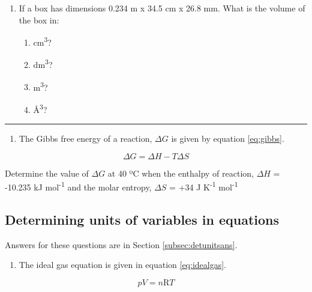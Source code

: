 \documentclass[
]{book}
\providecommand{\tightlist}{%
  \setlength{\itemsep}{0pt}\setlength{\parskip}{0pt}}
\begin{document}
\begin{enumerate}
\def\labelenumi{\arabic{enumi}.}
\setcounter{enumi}{1}
\tightlist
\item
  If a box has dimensions 0.234 m x 34.5 cm x 26.8 mm. What is the volume of the box in:

  \begin{enumerate}
  \def\labelenumii{\alph{enumii}.}
  \tightlist
  \item
    cm\textsuperscript{3}?
  \item
    dm\textsuperscript{3}?
  \item
    m\textsuperscript{3}?
  \item
    Å\textsuperscript{3}?
  \end{enumerate}
\end{enumerate}

\begin{center}\rule{0.5\linewidth}{0.5pt}\end{center}

\begin{enumerate}
\def\labelenumi{\arabic{enumi}.}
\setcounter{enumi}{2}
\tightlist
\item
  The Gibbs free energy of a reaction, \(\Delta G\) is given by equation \eqref{eq:gibbs}.
\end{enumerate}

\begin{equation}
\Delta G = \Delta H - T \Delta S
\label{eq:gibbs}
\end{equation}

Determine the value of \(\Delta G\) at 40 ºC when the enthalpy of reaction, \(\Delta H\) = -10.235 kJ mol\textsuperscript{-1} and the molar entropy, \(\Delta S\) = +34 J K\textsuperscript{-1} mol\textsuperscript{-1}

\hypertarget{subsec:detunits}{%
\subsection{Determining units of variables in equations}\label{subsec:detunits}}

Answers for these questions are in Section \ref{subsec:detunitsans}.

\begin{enumerate}
\def\labelenumi{\arabic{enumi}.}
\tightlist
\item
  The ideal gas equation is given in equation \eqref{eq:idealgas}.
\end{enumerate}

\begin{equation}
pV = n\textrm{R}T
\label{eq:idealgas}
\end{equation}
\end{document}
